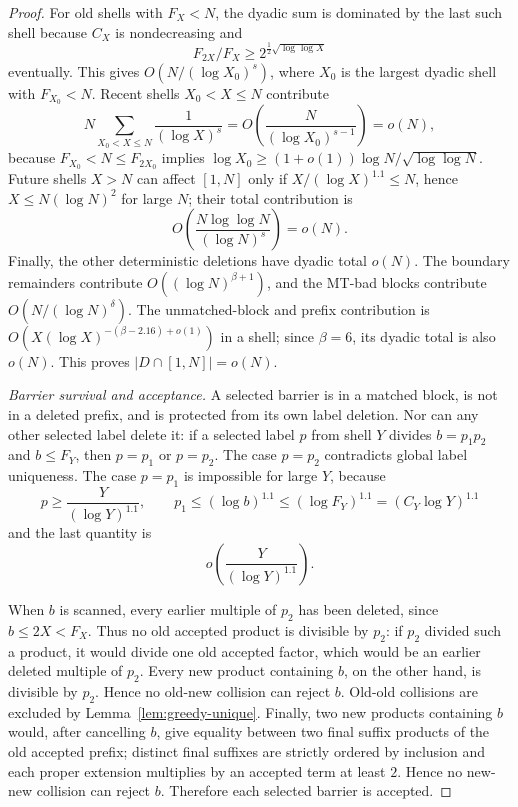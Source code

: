 \documentclass[11pt]{article}
\theoremstyle{definition}
\newcommand{\abs}[1]{\left|#1\right|}
\newcommand{\1}{\mathbf 1}
\begin{document}
\begin{proof}
For old shells with \(F_X<N\), the dyadic sum is dominated by the last such
shell because \(C_X\) is nondecreasing and
\[
  F_{2X}/F_X\ge 2^{\frac12\sqrt{\log\log X}}
\]
eventually.  This gives \(O(N/(\log X_0)^s)\), where \(X_0\) is the largest
dyadic shell with \(F_{X_0}<N\).  Recent shells \(X_0<X\le N\) contribute
\[
  N\sum_{X_0<X\le N}\frac1{(\log X)^s}
  =O\!\left(\frac{N}{(\log X_0)^{s-1}}\right)=o(N),
\]
because \(F_{X_0}<N\le F_{2X_0}\) implies
\(\log X_0\ge(1+o(1))\log N/\sqrt{\log\log N}\).  Future shells \(X>N\) can
affect \([1,N]\) only if \(X/(\log X)^{1.1}\le N\), hence
\(X\le N(\log N)^2\) for large \(N\); their total contribution is
\[
  O\!\left(\frac{N\log\log N}{(\log N)^s}\right)=o(N).
\]
Finally, the other deterministic deletions have dyadic total \(o(N)\).  The
boundary remainders contribute \(O((\log N)^{\beta+1})\), and the MT-bad blocks
contribute \(O(N/(\log N)^\delta)\).  The unmatched-block and prefix
contribution is \(O(X(\log X)^{-(\beta-2.16)+o(1)})\) in a shell; since
\(\beta=6\), its dyadic total is also \(o(N)\).  This proves
\(\abs{D\cap[1,N]}=o(N)\).

\smallskip
\noindent\emph{Barrier survival and acceptance.}
A selected barrier is in a matched block, is not in a deleted prefix, and is
protected from its own label deletion.  Nor can any other selected label
delete it: if a selected label \(p\) from shell \(Y\) divides \(b=p_1p_2\) and
\(b\le F_Y\), then \(p=p_1\) or \(p=p_2\).  The case \(p=p_2\) contradicts
global label uniqueness.  The case \(p=p_1\) is impossible for large \(Y\),
because
\[
  p\ge \frac{Y}{(\log Y)^{1.1}},
  \qquad
  p_1\le(\log b)^{1.1}\le(\log F_Y)^{1.1}
  =(C_Y\log Y)^{1.1}
\]
and the last quantity is
\[
  o\!\left(\frac{Y}{(\log Y)^{1.1}}\right).
\]

When \(b\) is scanned, every earlier multiple of \(p_2\) has been deleted,
since \(b\le2X<F_X\).  Thus no old accepted product is divisible by \(p_2\):
if \(p_2\) divided such a product, it would divide one old accepted factor,
which would be an earlier deleted multiple of \(p_2\).  Every new product
containing \(b\), on the other hand, is divisible by \(p_2\).  Hence no
old-new collision can reject \(b\).  Old-old collisions are excluded by
Lemma~\ref{lem:greedy-unique}.  Finally, two new products containing \(b\)
would, after cancelling \(b\), give equality between two final suffix products
of the old accepted prefix; distinct final suffixes are strictly ordered by
inclusion and each proper extension multiplies by an accepted term at least
\(2\).  Hence no new-new collision can reject \(b\).
Therefore each selected barrier is accepted.


\end{proof}
\end{document}
